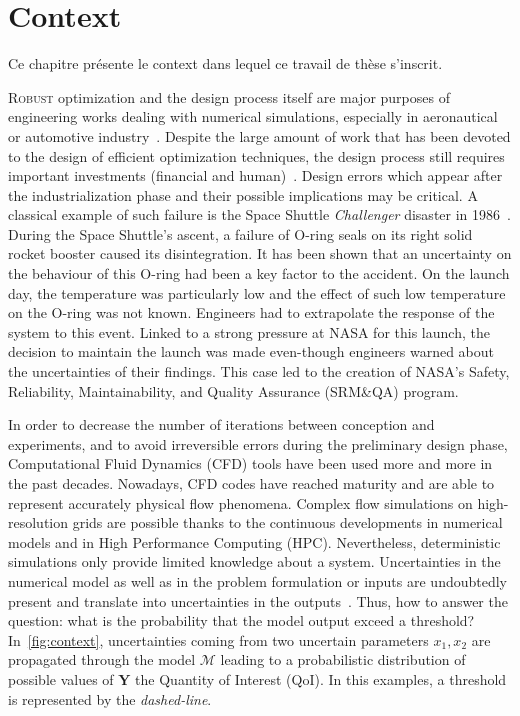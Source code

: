 \chapter{Context}

\begin{chapquote}
Ce chapitre présente le context dans lequel ce travail de thèse s'inscrit.
\end{chapquote}


\lettrine{R}{obust} optimization and the design process itself are major purposes of engineering works dealing with numerical simulations, especially in aeronautical or automotive industry~\cite{duchaine2009}. Despite the large amount of work that has been devoted to the design of efficient optimization techniques, the design process still requires important investments (financial and human)~\cite{forrester2009}. Design errors which appear after the industrialization phase and their possible implications may be critical. A classical example of such failure is the Space Shuttle \emph{Challenger} disaster in 1986~\cite{draper1995}. During the Space Shuttle's ascent, a failure of O-ring seals on its right solid rocket booster caused its disintegration. It has been shown that an uncertainty on the behaviour of this O-ring had been a key factor to the accident. On the launch day, the temperature was particularly low and the effect of such low temperature on the O-ring was not known. Engineers had to extrapolate the response of the system to this event. Linked to a strong pressure at NASA for this launch, the decision to maintain the launch was made even-though engineers warned about the uncertainties of their findings. This case led to the creation of NASA's Safety, Reliability, Maintainability, and Quality Assurance (SRM\&QA) program.

In order to decrease the number of iterations between conception and experiments, and to avoid irreversible errors during the preliminary design phase, Computational Fluid Dynamics (CFD) tools have been used more and more in the past decades. Nowadays, CFD codes have reached maturity and are able to represent accurately physical flow phenomena. Complex flow simulations on high-resolution grids are possible thanks to the continuous developments in numerical models and in High Performance Computing (HPC). Nevertheless, deterministic simulations only provide limited knowledge about a system. Uncertainties in the numerical model as well as in the problem formulation or inputs are undoubtedly present and translate into uncertainties in the outputs~\cite{Sacks1989}. Thus, how to answer the question: what is the probability that the model output exceed a threshold? In~\cref{fig:context}, uncertainties coming from two uncertain parameters $x_1,x_2$ are propagated through the model $\mathcal{M}$ leading to a probabilistic distribution of possible values of $\mathbf{Y}$ the Quantity of Interest (QoI). In this examples, a threshold is represented by the \emph{dashed-line}.

